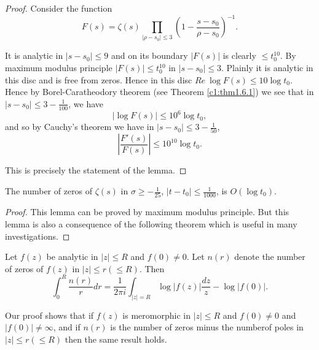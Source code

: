\begin{proof}
Consider the function
$$
F(s)=\zeta(s)\prod_{|\rho-s_{0}|\leq
  3}\left(1-\frac{s-s_{0}}{\rho-s_{0}}\right)^{-1}. 
$$

It is analytic in $|s-s_{0}|\leq 9$ and on its boundary $|F(s)|$ is
clearly $\leq t^{10}_{0}$. By maximum modulus principle $|F(s)|\leq
t^{10}_{0}$ in $|s-s_{0}|\leq 3$. Plainly it is analytic in this disc
and is free from zeros. Hence in this disc $Re\ \log F(s)\leq 10\log
t_{0}$. Hence by Borel-Caratheodory theorem (see Theorem
\ref{c1:thm1.6.1}) we see that in $|s-s_{0}|\leq 3-\frac{1}{100}$,
we have
$$
|\log F(s)|\leq 10^{6}\log t_{0},
$$
and so by Cauchy's theorem we have in $|s-s_{0}|\leq 3-\frac{1}{50}$,
$$
|\frac{F'(s)}{F(s)}|\leq 10^{10}\log t_{0}.
$$

This is precisely the statement of the lemma.
\end{proof}

\begin{lem}\label{c7:lem2}
The number of zeros of $\zeta(s)$ in $\sigma\geq -\frac{1}{25}$,
$|t-t_{0}|\leq \frac{1}{1000}$, is $O(\log t_{0})$.
\end{lem}

\eject

\begin{proof}
This lemma can be proved by maximum modulus principle. But this lemma
is also a consequence of the following theorem which is useful in many
investigations. 
\end{proof}

\begin{jtheorem}\label{c7:jthm7.5.1}
Let $f(z)$ be analytic in $|z|\leq R$ and $f(0)\neq 0$. Let $n(r)$
denote the number of zeros of $f(z)$ in $|z|\leq r(\leq R)$. Then 
$$
\int^{R}_{0}\frac{n(r)}{r}dr=\frac{1}{2\pi i}\int_{|z|=R}\log
|f(z)|\frac{dz}{z}-\log |f(0)|.
$$
\end{jtheorem}

\begin{remark*}
Our proof shows that if $f(z)$ is meromorphic in $|z|\leq R$ and
$f(0)\neq 0$ and $|f(0)|\neq \infty$, and if $n(r)$ is the number of
zeros minus the number\pageoriginale of poles in $|z|\leq r(\leq R)$
then the same result holds.
\end{remark*}

